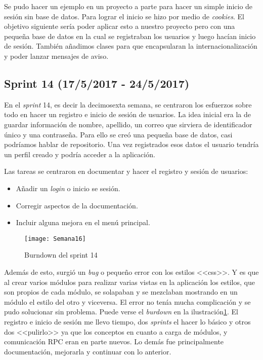 Se pudo hacer un ejemplo en un proyecto a parte para hacer un simple inicio de sesión sin base de datos. Para lograr el inicio se hizo por medio de \emph{cookies}. El objetivo siguiente sería poder aplicar esto a nuestro proyecto pero con una pequeña base de datos en la cual se registraban los usuarios y luego hacían inicio de sesión. También añadimos clases para que encapsularan la internacionalización y poder lanzar mensajes de aviso.

\subsection{Sprint 14 (17/5/2017 - 24/5/2017)}

En el \emph{sprint} 14, es decir la decimosexta semana, se centraron los esfuerzos sobre todo en hacer un registro e inicio de sesión de usuarios. La idea inicial era la de guardar información de nombre, apellido, un correo que sirviera de identificador único y una contraseña. Para ello se creó una pequeña base de datos, casi podríamos hablar de repositorio. Una vez registrados esos datos el usuario tendría un perfil creado y podría acceder a la aplicación.

Las tareas se centraron en documentar y hacer el registro y sesión de usuarios:
\begin{itemize}
\item Añadir un \emph{login} o inicio se sesión.
\item Corregir aspectos de la documentación.
\item Incluir alguna mejora en el menú principal.
\end{itemize}

\begin{figure}[h]
\centering
\texttt{[image: Semana16]}
\caption{Burndown del sprint 14}
\label{fig:A.13}
\end{figure}

Además de esto, surgió un \emph{bug} o pequeño error con los estilos <<css>>. Y es que al crear varios módulos para realizar varias vistas en la aplicación los estilos, que son propios de cada módulo, se solapaban y se mezclaban mostrando en un módulo el estilo del otro y viceversa. El error no tenía mucha complicación y se pudo solucionar sin problema. Puede verse el \emph{burdown} en la ilustración\ref{fig:A.13}.
El registro e inicio de sesión me llevo tiempo, dos \emph{sprints} el hacer lo básico y otros dos <<pulirlo>> ya que los conceptos en cuanto a carga de módulos, y comunicación RPC eran en parte nuevos. Lo demás fue principalmente documentación, mejorarla y continuar con lo anterior.

